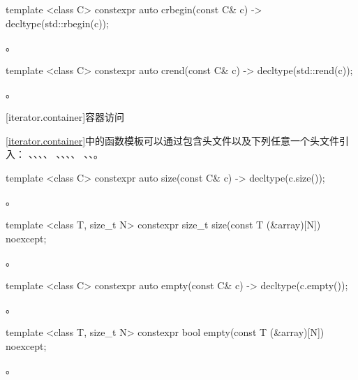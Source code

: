 %
\begin{itemdecl}
template <class C> constexpr auto crbegin(const C& c) -> decltype(std::rbegin(c));
\end{itemdecl}
\begin{itemdescr}
\pnum \returns {}。
\end{itemdescr}

%
\begin{itemdecl}
template <class C> constexpr auto crend(const C& c) -> decltype(std::rend(c));
\end{itemdecl}
\begin{itemdescr}
\pnum \returns {}。
\end{itemdescr}

[iterator.container]{容器访问}

\pnum
\ref{iterator.container}中的函数模板可以通过包含头文件以及下列任意一个头文件引入：
、、、、
、、、、
、、。

\begin{itemdecl}
template <class C> constexpr auto size(const C& c) -> decltype(c.size());
\end{itemdecl}
\begin{itemdescr}
\pnum \returns {}。
\end{itemdescr}

\begin{itemdecl}
template <class T, size_t N> constexpr size_t size(const T (&array)[N]) noexcept;
\end{itemdecl}
\begin{itemdescr}
\pnum \returns {}。
\end{itemdescr}

\begin{itemdecl}
template <class C> constexpr auto empty(const C& c) -> decltype(c.empty());
\end{itemdecl}
\begin{itemdescr}
\pnum \returns {}。
\end{itemdescr}

\begin{itemdecl}
template <class T, size_t N> constexpr bool empty(const T (&array)[N]) noexcept;
\end{itemdecl}
\begin{itemdescr}
\pnum \returns {}。
\end{itemdescr}

